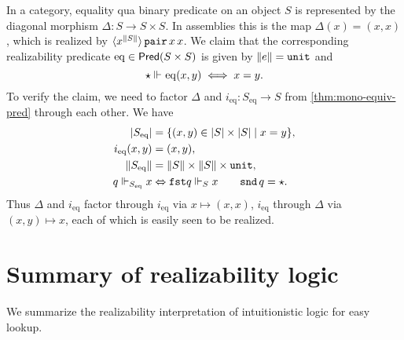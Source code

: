 In a category, equality qua binary predicate on an object $S$ is represented by the diagonal morphism $\Delta : S \to S \times S$. In assemblies this is the map $\Delta(x) = (x, x)$, which is realized by $\tpcalam{x}{\T{S}} \combPair\,x\,x$.
%
We claim that the corresponding realizability predicate $\mathrm{eq} \in \Pred{S \times S}$ is given by $\T{e} = \unit$ and
%
\begin{equation*}
  \star \rz \mathrm{eq} (x, y)
  \iff
  x = y.
\end{equation*}
%
To verify the claim, we need to factor $\Delta$ and $i_\mathrm{eq} : S_\mathrm{eq} \to S$ from \cref{thm:mono-equiv-pred} through each other. We have
%
\begin{align*}
  \S{S_\mathrm{eq}} &= \set{(x, y) \in \S{S} \times \S{S} \mid x = y},
  \\
  i_\mathrm{eq} (x,y) &= (x, y),
  \\
  \T{S_\mathrm{eq}} &= \T{S} \times \T{S} \times \unit,
  \\
  q \rz[S_\mathrm{eq}] x &\liff \combFst q \rz[S] x \and \combSnd\,q = \star.
\end{align*}
%
Thus $\Delta$ and $i_\mathrm{eq}$ factor through $i_\mathrm{eq}$ via $x \mapsto (x,x)$, $i_\mathrm{eq}$ through $\Delta$ via $(x, y) \mapsto x$, each of which is easily seen to be realized.

\section{Summary of realizability logic}
\label{sec:realizability-summary}


We summarize the realizability interpretation of intuitionistic logic for easy lookup.

